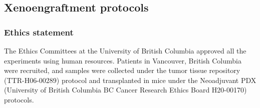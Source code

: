 \documentclass{article}
\begin{document}


\subsection{Xenoengraftment protocols} 
\subsubsection{Ethics statement}
The Ethics Committees at the University of British Columbia approved all the experiments using human resources.  
Patients in Vancouver, British Columbia were recruited, and samples were collected under the tumor tissue repository (TTR-H06-00289) protocol and transplanted in mice under the Neoadjuvant PDX (University of British Columbia BC Cancer Research Ethics Board H20-00170) protocols.
\end{document}
